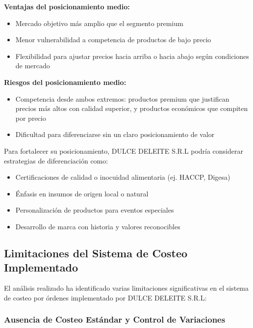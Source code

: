 \documentclass[
  stu,
  floatsintext,
  longtable,
  a4paper,
  nolmodern,
  notxfonts,
  notimes,
  12pt,
  colorlinks=true,linkcolor=blue,citecolor=blue,urlcolor=blue]{apa7}
\providecommand{\tightlist}{%
  \setlength{\itemsep}{0pt}\setlength{\parskip}{0pt}}
\begin{document}
\textbf{Ventajas del posicionamiento medio:}

\begin{itemize}
\tightlist
\item
  Mercado objetivo más amplio que el segmento premium
\item
  Menor vulnerabilidad a competencia de productos de bajo precio
\item
  Flexibilidad para ajustar precios hacia arriba o hacia abajo según
  condiciones de mercado
\end{itemize}

\textbf{Riesgos del posicionamiento medio:}

\begin{itemize}
\tightlist
\item
  Competencia desde ambos extremos: productos premium que justifican
  precios más altos con calidad superior, y productos económicos que
  compiten por precio
\item
  Dificultad para diferenciarse sin un claro posicionamiento de valor
\end{itemize}

Para fortalecer su posicionamiento, DULCE DELEITE S.R.L podría
considerar estrategias de diferenciación como:

\begin{itemize}
\tightlist
\item
  Certificaciones de calidad o inocuidad alimentaria (ej. HACCP, Digesa)
\item
  Énfasis en insumos de origen local o natural
\item
  Personalización de productos para eventos especiales
\item
  Desarrollo de marca con historia y valores reconocibles
\end{itemize}

\subsection{Limitaciones del Sistema de Costeo
Implementado}\label{limitaciones-del-sistema-de-costeo-implementado}

El análisis realizado ha identificado varias limitaciones significativas
en el sistema de costeo por órdenes implementado por DULCE DELEITE
S.R.L:

\subsubsection{Ausencia de Costeo Estándar y Control de
Variaciones}\label{ausencia-de-costeo-estuxe1ndar-y-control-de-variaciones}
\end{document}
